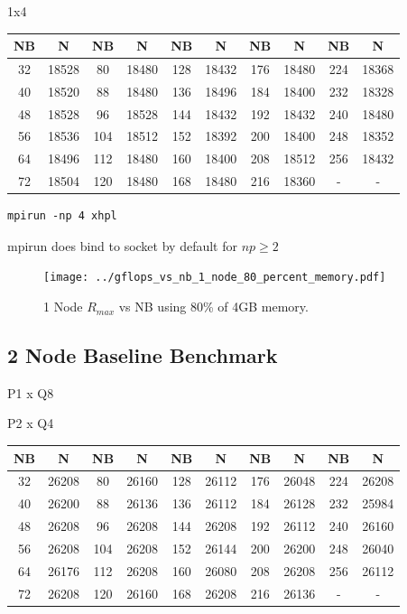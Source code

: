 \documentclass{article}
\begin{document}
1x4

\begin{center}
	\begin{tabular}{ |c|c|c|c|c|c|c|c|c|c| } 
		\hline
		NB & N & NB & N & NB & N & NB & N & NB & N \\ 
		\hline
		32 & 18528 &  80 & 18480 & 128 & 18432 & 176 & 18480 & 224 & 18368 \\ 
		40 & 18520 &  88 & 18480 & 136 & 18496 & 184 & 18400 & 232 & 18328 \\ 
 		48 & 18528 &  96 & 18528 & 144 & 18432 & 192 & 18432 & 240 & 18480 \\
		56 & 18536 & 104 & 18512 & 152 & 18392 & 200 & 18400 & 248 & 18352 \\ 
 		64 & 18496 & 112 & 18480 & 160 & 18400 & 208 & 18512 & 256 & 18432 \\
		72 & 18504 & 120 & 18480 & 168 & 18480 & 216 & 18360 &   - &     - \\ 
 		\hline
	\end{tabular}
\end{center}

\begin{lstlisting}[frame=single]
mpirun -np 4 xhpl
\end{lstlisting}

mpirun does bind to socket by default for $np \geq 2$

\begin{figure}
	\centering	
	\texttt{[image: ../gflops\_vs\_nb\_1\_node\_80\_percent\_memory.pdf]}
	\caption{1 Node $R_{max}$ vs NB using 80\% of 4GB memory.}
\end{figure}



\subsection{2 Node Baseline Benchmark}

P1 x Q8

P2 x Q4

\begin{center}
	\begin{tabular}{ |c|c|c|c|c|c|c|c|c|c| } 
		\hline
		NB & N & NB & N & NB & N & NB & N & NB & N \\ 
		\hline
		32 & 26208 &   80 & 26160 & 128 & 26112 & 176 & 26048 & 224 & 26208 \\ 
		40 & 26200 &   88 & 26136 & 136 & 26112 & 184 & 26128 & 232 & 25984 \\ 
 		48 & 26208 &   96 & 26208 & 144 & 26208 & 192 & 26112 & 240 & 26160 \\
		56 & 26208 & 104 & 26208 & 152 & 26144 & 200 & 26200 & 248 & 26040 \\ 
 		64 & 26176 & 112 & 26208 & 160 & 26080 & 208 & 26208 & 256 & 26112 \\
		72 & 26208 & 120 & 26160 & 168 & 26208 & 216 & 26136 &     - &         - \\ 
 		\hline
	\end{tabular}
\end{center}
\end{document}
